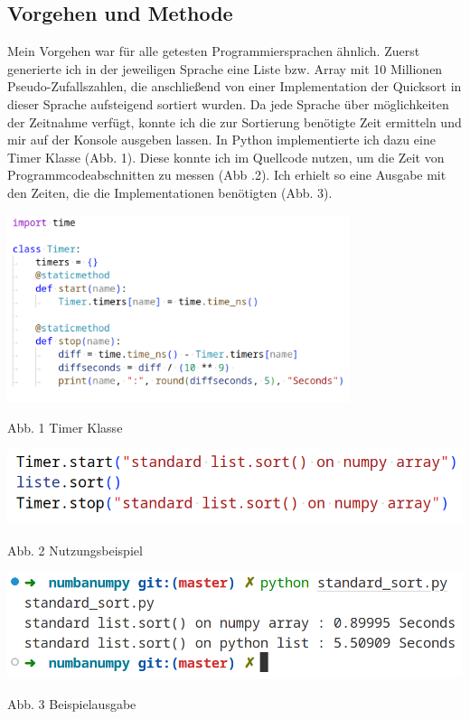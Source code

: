 \documentclass[10pt,a4paper]{article}
\begin{document}
\subsection{Vorgehen und Methode}

Mein Vorgehen war für alle getesten Programmiersprachen ähnlich.
Zuerst generierte ich in der jeweiligen Sprache eine Liste bzw. Array mit 10 Millionen Pseudo-Zufallszahlen,
die anschließend von einer Implementation der Quicksort in dieser Sprache aufsteigend sortiert wurden.
Da jede Sprache über möglichkeiten der Zeitnahme verfügt, konnte ich die zur Sortierung benötigte Zeit
ermitteln und mir auf der Konsole ausgeben lassen. In Python implementierte ich dazu eine Timer Klasse
(Abb. 1). Diese konnte ich im Quellcode nutzen, um die Zeit von Programmcodeabschnitten zu messen (Abb .2).
Ich erhielt so eine Ausgabe mit den Zeiten, die die Implementationen benötigten (Abb. 3).

\begin{center}
    \includegraphics[width=0.75\textwidth]{screenshots/pythontimerlight.png}

    Abb. 1 Timer Klasse
\end{center}

\begin{center}
    \includegraphics[width=.75\textwidth]{screenshots/timerexamplelight.png}

    Abb. 2 Nutzungsbeispiel

    \includegraphics[width=.75\textwidth]{screenshots/outputexamplelight.png}

    Abb. 3 Beispielausgabe
\end{center}
\end{document}
